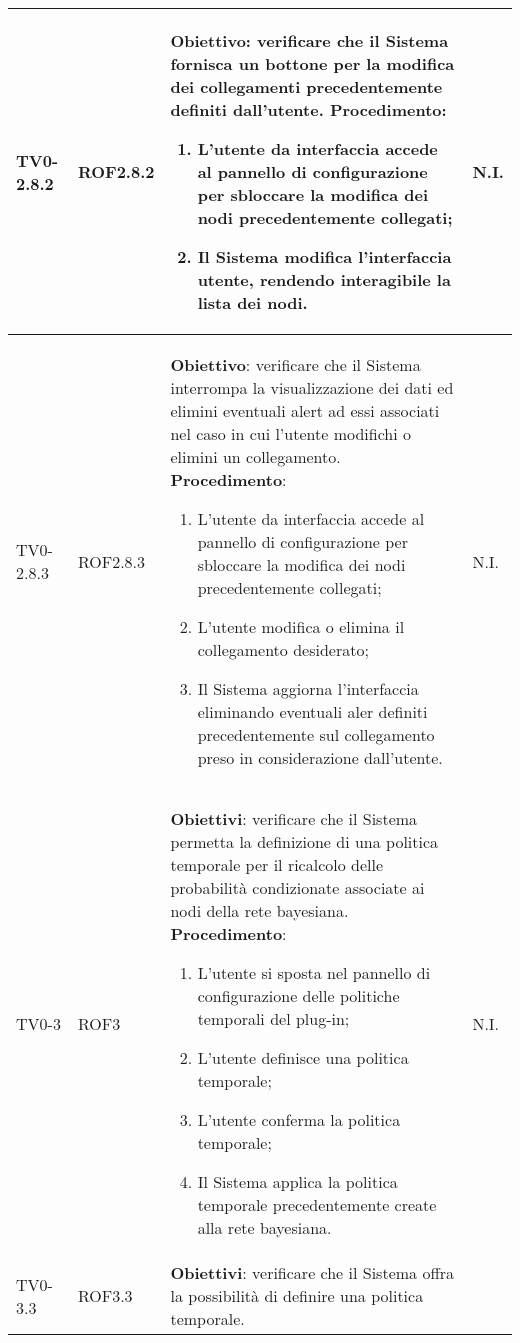\begin{longtable}{|C{.15\textwidth}|C{.13\textwidth}|m{.52\textwidth}|C{.08\textwidth}|}
\hline
{} TV0-2.8.2 & ROF2.8.2 &
	\textbf{Obiettivo}: verificare che il Sistema fornisca un bottone per la modifica dei collegamenti precedentemente definiti dall'utente. \newline
	\textbf{Procedimento}:
	\begin{enumerate}
		\item L'utente da interfaccia accede al pannello di configurazione per sbloccare la modifica dei nodi precedentemente collegati;
		\item Il Sistema modifica l'interfaccia utente, rendendo interagibile la lista dei nodi.
	\end{enumerate}
	& N.I. \\
\hline
TV0-2.8.3 & ROF2.8.3 &
	\textbf{Obiettivo}: verificare che il Sistema interrompa la visualizzazione dei dati ed elimini eventuali alert ad essi associati nel caso in cui l'utente modifichi o elimini un collegamento. \newline
	\textbf{Procedimento}:
	\begin{enumerate}
		\item L'utente da interfaccia accede al pannello di configurazione per sbloccare la modifica dei nodi precedentemente collegati;
		\item L'utente modifica o elimina il collegamento desiderato;
		\item Il Sistema aggiorna l'interfaccia eliminando eventuali aler definiti precedentemente sul collegamento preso in considerazione dall'utente.
	\end{enumerate}
	& N.I. \\
\hline
{} TV0-3 & ROF3 &
	\textbf{Obiettivi}: verificare che il Sistema permetta la definizione di una politica temporale per il ricalcolo delle probabilità condizionate associate ai nodi della rete bayesiana. \newline
	\textbf{Procedimento}:
	\begin{enumerate}
		\item L'utente si sposta nel pannello di configurazione delle politiche temporali del plug-in;
		\item L'utente definisce una politica temporale;
		\item L'utente conferma la politica temporale;
		\item Il Sistema applica la politica temporale precedentemente create alla rete bayesiana.
	\end{enumerate}
	& N.I. \\
\hline
TV0-3.3 & ROF3.3 &
	\textbf{Obiettivi}: verificare che il Sistema offra la possibilità di definire una politica temporale. \newline

\end{longtable}
